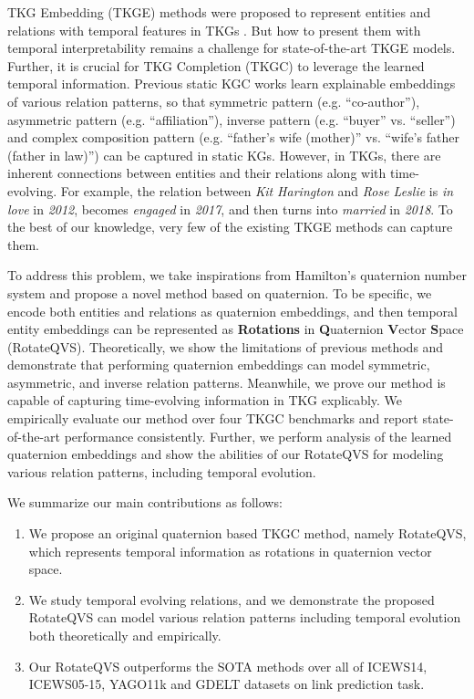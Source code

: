 \documentclass[11pt]{article}
\begin{document}
TKG Embedding (TKGE) methods \cite{jiang2016towards,dasgupta2018hyte,jin2020recurrent,ChronoR} were proposed to represent entities and relations with temporal features in TKGs  \cite{lautenschlager2015icews,leetaru2013gdelt}.
But how to present them with temporal interpretability remains a challenge for state-of-the-art TKGE models.
Further, it is crucial for TKG Completion (TKGC) to leverage the learned temporal information.
Previous static KGC works \cite{sun2019re,Schlichtkrull2018Modeling,gao2020rotate3d} learn explainable embeddings of various relation patterns, so that symmetric pattern (e.g. ``co-author''), asymmetric pattern (e.g. ``affiliation''), inverse pattern (e.g. ``buyer'' vs. ``seller'') and complex composition pattern (e.g. ``father's wife (mother)'' vs. ``wife's father (father in law)'') can be captured in static KGs. However, in TKGs, there are inherent connections between entities and their relations along with time-evolving.
For example, the relation between \textit{Kit Harington} and \textit{Rose Leslie} is \textit{in love} in \textit{2012}, becomes \textit{engaged} in \textit{2017}, and then turns into \textit{married} in \textit{2018}.
To the best of our knowledge, very few of the existing TKGE methods can capture them.



To address this problem, we take inspirations from Hamilton's quaternion number system \cite{Hamilton1844,zhang2019quaternion,gao2020rotate3d} and propose
a novel method based on quaternion. To be specific, we encode both entities and relations as quaternion embeddings, and then temporal entity embeddings can be represented as \textbf{Rotations} in \textbf{Q}uaternion \textbf{V}ector \textbf{S}pace (RotateQVS).
Theoretically, we show the limitations of previous methods and demonstrate that performing quaternion embeddings can model symmetric, asymmetric, and inverse relation patterns.
Meanwhile, we prove our method is capable of capturing time-evolving information in TKG explicably.
We empirically evaluate our method over four TKGC benchmarks and report state-of-the-art performance consistently.
Further, we perform analysis of the learned quaternion embeddings and show the abilities of our RotateQVS for modeling various relation patterns, including temporal evolution.

We summarize our main contributions as follows:
\begin{enumerate}
\item We propose an original quaternion based TKGC method, namely RotateQVS, which represents temporal information as rotations in quaternion vector space.

\item We study temporal evolving relations, and we demonstrate the proposed RotateQVS can model various relation patterns including temporal evolution both theoretically and empirically.

\item Our RotateQVS outperforms the SOTA methods over all of ICEWS14, ICEWS05-15, YAGO11k and GDELT datasets on link prediction task.
\end{enumerate}
\end{document}

